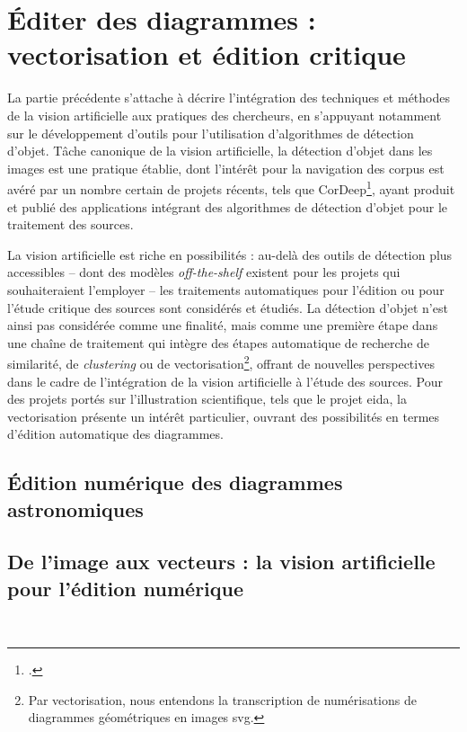 \documentclass[a4paper,12pt,twoside]{book}
\newcommand{\eida}{\gls{eida}\xspace}
\newcommand{\svg}{\gls{svg}\xspace}
\begin{document}
        \chapter[Éditer des diagrammes]{Éditer des diagrammes : vectorisation et édition critique}
        La partie précédente s'attache à décrire l'intégration des techniques et méthodes de la vision artificielle aux pratiques des chercheurs, en s'appuyant notamment sur le développement d'outils pour l'utilisation d'algorithmes de détection d'objet. Tâche canonique de la vision artificielle, la détection d'objet dans les images est une pratique établie, dont l'intérêt pour la navigation des corpus est avéré par un nombre certain de projets récents, tels que CorDeep\footcite{CorDeep}, ayant produit et publié des applications intégrant des algorithmes de détection d'objet pour le traitement des sources.
        
        La vision artificielle est riche en possibilités : au-delà des outils de détection plus accessibles -- dont des modèles \textit{off-the-shelf} existent pour les projets qui souhaiteraient l'employer -- les traitements automatiques pour l'édition ou pour l'étude critique des sources sont considérés et étudiés. La détection d'objet n'est ainsi pas considérée comme une finalité, mais comme une première étape dans une chaîne de traitement qui intègre des étapes automatique de recherche de similarité, de \textit{clustering} ou de vectorisation\footnote{Par vectorisation, nous entendons la transcription de numérisations de diagrammes géométriques en images \svg.}, offrant de nouvelles perspectives dans le cadre de l'intégration de la vision artificielle à l'étude des sources. Pour des projets portés sur l'illustration scientifique, tels que le projet \eida, la vectorisation présente un intérêt particulier, ouvrant des possibilités en termes d'édition automatique des diagrammes.
        
            \section{Édition numérique des diagrammes astronomiques}
                
        
            \section[De l’image aux vecteurs]{\label{vectorEdition}De l’image aux vecteurs : la vision artificielle pour l’édition numérique}
                
        	\\
        
\end{document}
